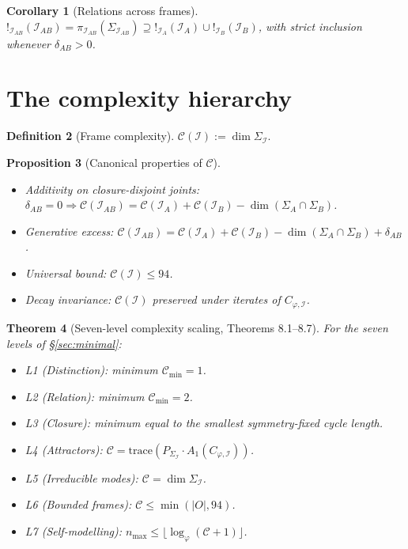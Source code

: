 \documentclass[11pt]{article}
\theoremstyle{plain}
\newtheorem{theorem}{Theorem}[section]
\newtheorem{proposition}[theorem]{Proposition}
\newtheorem{corollary}[theorem]{Corollary}
\theoremstyle{definition}
\newtheorem{definition}[theorem]{Definition}
\theoremstyle{remark}
\newcommand{\Ical}{\mathcal{I}}
\newcommand{\Ccal}{\mathcal{C}}
\begin{document}
\begin{corollary}[Relations across frames]\label{cor:relations-cross-frames}
$!_{\Ical_{AB}}(\Ical_{AB}) = \pi_{\Ical_{AB}}(\Sigma_{\Ical_{AB}}) \supseteq !_{\Ical_A}(\Ical_A) \cup !_{\Ical_B}(\Ical_B)$, with strict inclusion whenever $\delta_{AB} > 0$.
\end{corollary}

\section{The complexity hierarchy}\label{sec:complexity}

\begin{definition}[Frame complexity]\label{def:complexity}
$\Ccal(\Ical) := \dim \Sigma_\Ical$.
\end{definition}

\begin{proposition}[Canonical properties of $\Ccal$]\label{prop:complexity-properties}
\begin{itemize}[leftmargin=2em]
\item[(C1)] Additivity on closure-disjoint joints: $\delta_{AB} = 0 \Rightarrow \Ccal(\Ical_{AB}) = \Ccal(\Ical_A) + \Ccal(\Ical_B) - \dim(\Sigma_A \cap \Sigma_B)$.
\item[(C2)] Generative excess: $\Ccal(\Ical_{AB}) = \Ccal(\Ical_A) + \Ccal(\Ical_B) - \dim(\Sigma_A \cap \Sigma_B) + \delta_{AB}$.
\item[(C3)] Universal bound: $\Ccal(\Ical) \leq 94$.
\item[(C4)] Decay invariance: $\Ccal(\Ical)$ preserved under iterates of $C_{\varphi,\Ical}$.
\end{itemize}
\end{proposition}

\begin{theorem}[Seven-level complexity scaling, \citet{AlgebraicExistence} Theorems 8.1--8.7]\label{thm:seven-layer}
For the seven levels of \S\ref{sec:minimal}:
\begin{itemize}[leftmargin=2em]
\item L1 (Distinction): minimum $\Ccal_{\min} = 1$.
\item L2 (Relation): minimum $\Ccal_{\min} = 2$.
\item L3 (Closure): minimum equal to the smallest symmetry-fixed cycle length.
\item L4 (Attractors): $\Ccal = \mathrm{trace}(P_{\Sigma_\Ical} \cdot A_1(C_{\varphi,\Ical}))$.
\item L5 (Irreducible modes): $\Ccal = \dim \Sigma_\Ical$.
\item L6 (Bounded frames): $\Ccal \leq \min(|O|, 94)$.
\item L7 (Self-modelling): $n_{\max} \leq \lfloor \log_\varphi(\Ccal + 1) \rfloor$.
\end{itemize}
\end{theorem}
\end{document}
